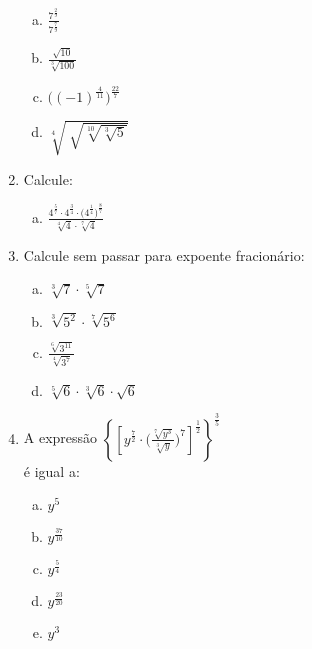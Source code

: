 \documentclass[a4paper,14pt]{article}
\begin{document}
\begin{multicols}{2}
\begin{enumerate}
\begin{enumerate}[a)]
           \item $\frac{7^\frac{2}{9}}{7^\frac{7}{9}}$ \\
           \item $\frac{\sqrt{10}}{\sqrt[3]{100}}$ \\
           \item $\bigg((-1)^\frac{4}{11}\bigg)^\frac{22}{7}$ \\
           \item $\sqrt[4]{\sqrt[~]{\sqrt[10]{\sqrt[3]{5}}}}$ \\
       \end{enumerate}
       \item Calcule:
       \begin{enumerate}[a)]
           \item $\frac{4^\frac{5}{7} \cdot 4^\frac{3}{4} \cdot \bigg(4^\frac{1}{4} \bigg)^\frac{8}{7}}{\sqrt[4]{4} \cdot \sqrt[7]{4}}$
       \end{enumerate}
       \item Calcule sem passar para expoente fracionário:
       \begin{enumerate}[a)]
       	\item $\sqrt[3]{7} \cdot \sqrt[5]{7}$
       	\item $\sqrt[3]{5^2} \cdot \sqrt[7]{5^6}$
       	\item $\frac{\sqrt[6]{3^{11}}}{\sqrt[4]{3^7}}$
       	\item $\sqrt[5]{6} \cdot \sqrt[3]{6} \cdot \sqrt{6}$
       \end{enumerate}
       \item A expressão $\left\{ \left[ y^\frac{7}{2} \cdot \bigg( \frac{\sqrt[7]{y^3}}{\sqrt[3]{y}} \bigg)^7 \right]^\frac{1}{2} \right\}^\frac{3}{5}$ \\ é igual a:
       \begin{enumerate}[a)]
       	\item $y^5$ \item $y^\frac{37}{10}$ \item $y^\frac{5}{4}$ \item $y^\frac{23}{20}$ \item $y^3$
       \end{enumerate}

\end{enumerate}
\end{multicols}
\end{document}
